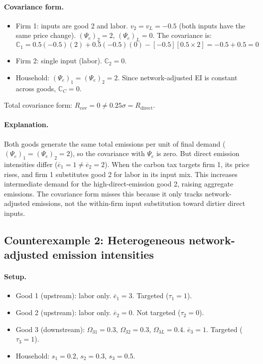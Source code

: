 \documentclass[11pt]{article}
\begin{document}
\paragraph{Covariance form.}
\begin{itemize}
    \item Firm 1: inputs are good 2 and labor. $v_2 = v_L = -0.5$ (both inputs have the same price change). $(\Psi_e)_2 = 2$, $(\Psi_e)_L = 0$. The covariance is:
    $$\mathbb{C}_1 = 0.5(-0.5)(2) + 0.5(-0.5)(0) - [-0.5][0.5 \times 2] = -0.5 + 0.5 = 0$$
    \item Firm 2: single input (labor). $\mathbb{C}_2 = 0$.
    \item Household: $(\Psi_e)_1 = (\Psi_e)_2 = 2$. Since network-adjusted EI is constant across goods, $\mathbb{C}_C = 0$.
\end{itemize}

Total covariance form: $R_{\text{cov}} = 0 \neq 0.25\sigma = R_{\text{direct}}$.

\paragraph{Explanation.} Both goods generate the same total emissions per unit of final demand ($(\Psi_e)_1 = (\Psi_e)_2 = 2$), so the covariance with $\Psi_e$ is zero. But direct emission intensities differ ($\overline{e}_1 = 1 \neq \overline{e}_2 = 2$). When the carbon tax targets firm 1, its price rises, and firm 1 substitutes good 2 for labor in its input mix. This increases intermediate demand for the high-direct-emission good 2, raising aggregate emissions. The covariance form misses this because it only tracks network-adjusted emissions, not the within-firm input substitution toward dirtier direct inputs.

\subsection{Counterexample 2: Heterogeneous network-adjusted emission intensities}

\paragraph{Setup.}
\begin{itemize}
    \item Good 1 (upstream): labor only. $\overline{e}_1 = 3$. Targeted ($\tau_1 = 1$).
    \item Good 2 (upstream): labor only. $\overline{e}_2 = 0$. Not targeted ($\tau_2 = 0$).
    \item Good 3 (downstream): $\Omega_{31} = 0.3$, $\Omega_{32} = 0.3$, $\Omega_{3L} = 0.4$. $\overline{e}_3 = 1$. Targeted ($\tau_3 = 1$).
    \item Household: $s_1 = 0.2$, $s_2 = 0.3$, $s_3 = 0.5$.
\end{itemize}
\end{document}
